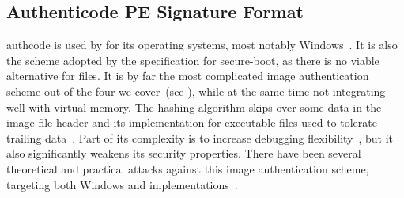 \subsection{Authenticode PE Signature Format}
\label{sec:authenticode}

\Gls{authcode} is used by  for its operating systems, most notably Windows~\cite{pe-authenticode}. It is also the scheme adopted by the  specification for \gls{secure-boot}, as there is no viable alternative for  files. It is by far the most complicated \gls{image} authentication scheme out of the four we cover~(see ), while at the same time not integrating well with \gls{virtual-memory}. The hashing algorithm skips over some data in the \gls{image-file-header} and its implementation for \glspl{executable-file} used to tolerate trailing data~\cite{jar-msi-auth-bug}. Part of its complexity is to increase debugging flexibility~\cite{pe-authenticode}, but it also significantly weakens its security properties. There have been several theoretical and practical attacks against this \gls{image} authentication scheme, targeting both Windows and  implementations~\cite{secure-pe,jar-msi-auth-bug,mic-auth-bug,win-auth-bug,uefi-auth-bug}.

